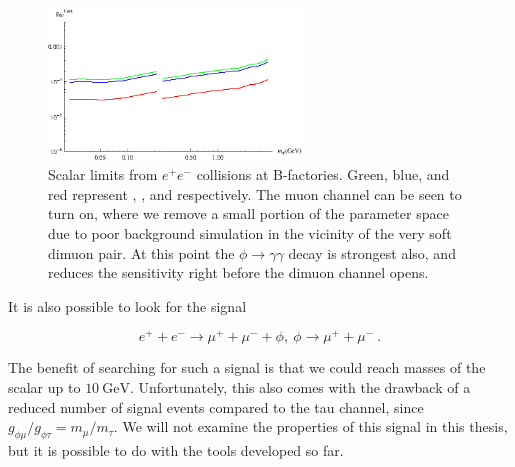 \begin{figure}[h]
    \centering
    \includegraphics[width=0.6\textwidth]{Figures/limits/ee_all}
    \caption{Scalar limits from $e^+ e^-$ collisions at B-factories. Green, blue, and red represent \babar, \belle, and \belletwo respectively. The muon channel can be seen to turn on, where we remove a small portion of the parameter space due to poor background simulation in the vicinity of the very soft dimuon pair. At this point the $\phi \rightarrow \gamma \gamma$ decay is strongest also, and reduces the sensitivity right before the dimuon channel opens.}
    \label{fig:ee_limits}
\end{figure}

It is also possible to look for the signal

\begin{equation}
    e^+ + e^- \rightarrow \mu^+ + \mu^- + \phi,~\phi \rightarrow \mu^+ + \mu^-~\textrm{.}
\end{equation}

\noindent The benefit of searching for such a signal is that we could reach masses of the scalar up to $10~\textrm{GeV}$.
Unfortunately, this also comes with the drawback of a reduced number of signal events compared to the tau channel, since $g_{\phi\mu} / g_{\phi\tau} = m_\mu / m_\tau$.
We will not examine the properties of this signal in this thesis, but it is possible to do with the tools developed so far.
